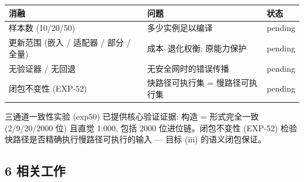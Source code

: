 \documentclass[
]{article}
\begin{document}
\begin{longtable}[]{@{}
  >{\raggedright\arraybackslash}p{}
  >{\raggedright\arraybackslash}p{}
  >{\raggedright\arraybackslash}p{}@{}}
\toprule\noalign{}
\begin{minipage}[b]{\linewidth}\raggedright
消融
\end{minipage} & \begin{minipage}[b]{\linewidth}\raggedright
问题
\end{minipage} & \begin{minipage}[b]{\linewidth}\raggedright
状态
\end{minipage} \\
\midrule\noalign{}
\endhead
\bottomrule\noalign{}
\endlastfoot
样本数 (10/20/50) & 多少实例足以编译 & pending \\
更新范围 (嵌入 / 适配器 / 部分 / 全量) & 成本--退化权衡; 原能力保护 &
pending \\
无验证器 / 无回退 & 无安全网时的错误传播 & pending \\
闭包不变性 (EXP-52) & 快路径可执行集 = 慢路径可执行集 & pending \\
\end{longtable}

三通道一致性实验 (exp50) 已提供核心验证证据: 构造 = 形式完全一致
(2/9/20/2000 位) 且直觉 1.000, 包括 2000 位进位链。闭包不变性 (EXP-52)
检验快路径是否精确执行慢路径可执行的输入 --- 目标 (iii) 的语义闭包保证。

\subsection{6 相关工作}\label{ux76f8ux5173ux5de5ux4f5c}
\end{document}
